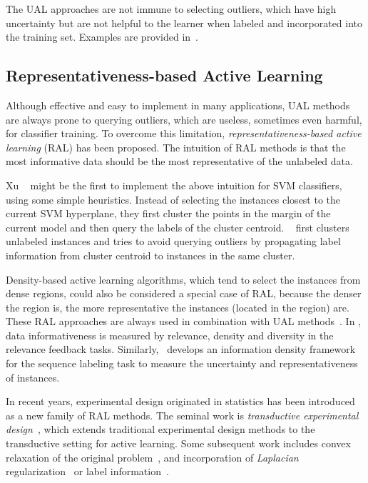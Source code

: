 The \mbox{UAL} approaches are not immune to selecting outliers, which have high uncertainty but are not helpful to the learner when labeled and incorporated into the training set. Examples are provided in~\cite{McCallum1998icml}.

\subsection{Representativeness-based Active Learning}
Although effective and easy to implement in many applications, \mbox{UAL} methods are always prone to querying outliers, which are useless, sometimes even harmful, for classifier training. To overcome this limitation, \textit{representativeness-based active learning} (\mbox{RAL}) has been proposed. The intuition of \mbox{RAL} methods is that the most informative data should be the most representative of the unlabeled data.

Xu \etal~\cite{Xu2003ecir} might be the first to implement the above intuition for \mbox{SVM} classifiers, using some simple heuristics. Instead of selecting the instances closest to the current \mbox{SVM} hyperplane, they first cluster the points in the margin of the current model and then query the labels of the cluster centroid. ~\cite{Nguyen2004icml} first clusters unlabeled instances and tries to avoid querying outliers by propagating label information from cluster centroid to instances in the same cluster. 

Density-based active learning algorithms, which tend to select the instances from dense regions, could also be considered a special case of \mbox{RAL}, because the denser the region is, the more representative the instances (located in the region) are. These \mbox{RAL} approaches are always used in combination with \mbox{UAL} methods~\cite{Xu2007ecir,Settles2008emnlp}. In \cite{Xu2007ecir}, data informativeness is measured by relevance, density and diversity in the relevance feedback tasks. Similarly,~\cite{Settles2008emnlp} develops an information density framework for the sequence labeling task to measure the uncertainty and representativeness of instances.

In recent years, experimental design originated in statistics has been introduced as a new family of \mbox{RAL} methods. The seminal work is \textit{transductive experimental design}~\cite{Yu2006icml}, which extends traditional experimental design methods to the transductive setting for active learning. Some subsequent work includes convex relaxation of the original problem~\cite{Yu2008sigir}, and incorporation of \textit{Laplacian} regularization~\cite{he2007sigir} or label information~\cite{zhen2010sigir}.


